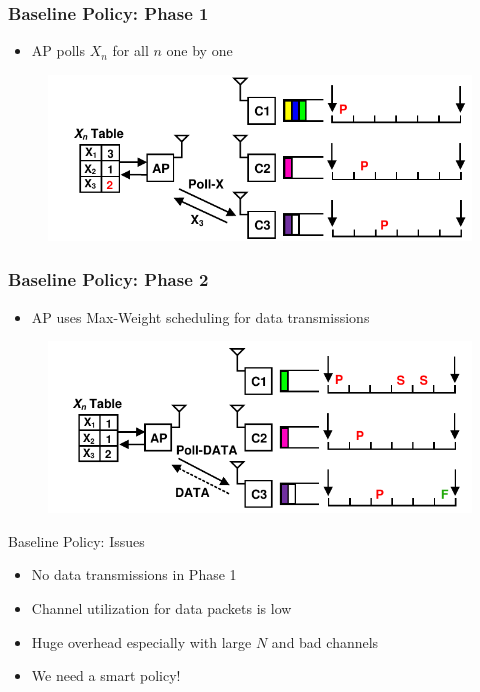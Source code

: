 \documentclass{beamer}
\begin{document}
\begin{frame}
\frametitle{Baseline Policy: Phase 1}
\begin{itemize}
\item AP polls $X_n$ for all $n$ one by one
\end{itemize}
\begin{figure}
\centering
\includegraphics[scale=0.8]{animation_03.pdf}
\end{figure}
\end{frame}

\begin{frame}
\frametitle{Baseline Policy: Phase 2}
\begin{itemize}
\item AP uses Max-Weight scheduling for data transmissions
\end{itemize}
\begin{figure}
\centering
\includegraphics[scale=0.8]{animation_06.pdf}
\end{figure}
\end{frame}

\begin{frame}{Baseline Policy: Issues}
  \begin{itemize}
    \item No data transmissions in Phase 1
    \item Channel utilization for data packets is low
    \item Huge overhead especially with large $N$ and bad channels
      \pause
    \item We need a smart policy!
  \end{itemize}
\end{frame}
\end{document}

